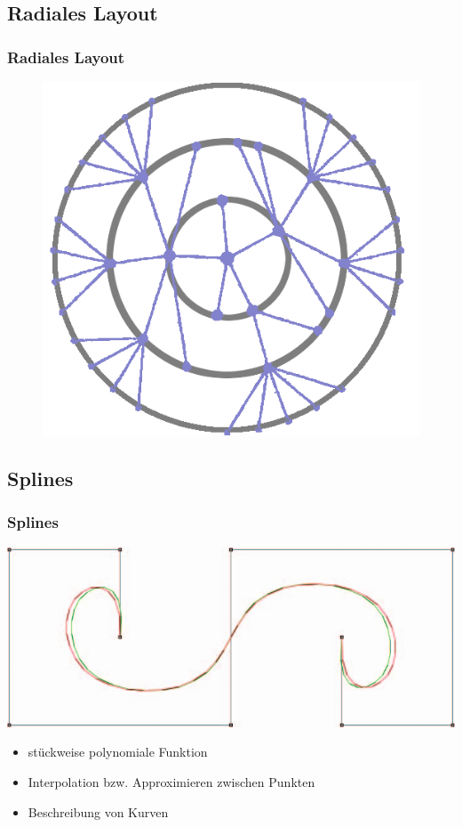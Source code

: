 \documentclass[11pt]{beamer}
\begin{document}
\subsection{Radiales Layout}
\begin{frame}
\frametitle{Radiales Layout}
\begin{figure}
\centering
\includegraphics[width=0.6\linewidth]{./RadialTree.png}
\end{figure}
\end{frame}

\subsection{Splines}
\begin{frame}
\frametitle{Splines}
\includegraphics[width=0.6\linewidth]{./Splines.png}
\begin{itemize}
\item stückweise polynomiale Funktion
\item Interpolation bzw. Approximieren zwischen Punkten
\item Beschreibung von Kurven
\end{itemize}
\end{frame}
\end{document}
